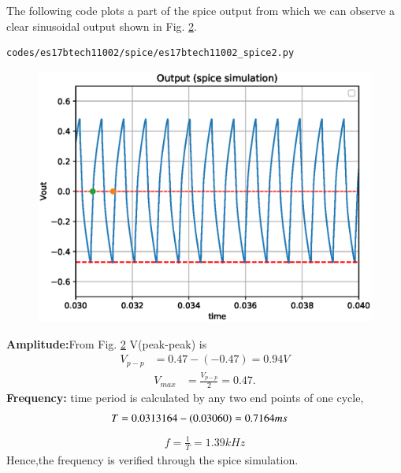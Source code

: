 \begin{enumerate}[label=\arabic*.,ref=\theenumi]
\begin{figure}[!ht]
\caption{}
\label{fig:es17btech11002_spice}
\end{figure}
%
The following code plots a part of the spice output from which we can observe a clear sinusoidal output shown in Fig. \ref{fig:es17btech11002_spice2}.
\begin{lstlisting}
codes/es17btech11002/spice/es17btech11002_spice2.py
\end{lstlisting}
\begin{figure}[!ht]
\centering
\includegraphics[width=\columnwidth]{./figs/es17btech11002/es17btech11002_spice2.eps}
\caption{}
\label{fig:es17btech11002_spice2}
\end{figure}
\renewcommand{\thefigure}{\theenumi}
\textbf{Amplitude:}From Fig. \ref{fig:es17btech11002_spice2} V(peak-peak) is 
\begin{align}
V_{p-p} &= 0.47-(-0.47) = 0.94V
\end{align}
\begin{align}
V_{max} &= \frac{V_{p-p}}{2} = 0.47.
\end{align}
\textbf{Frequency:} time period is calculated by any two end points of one cycle,
\begin{align}
T&=0.0313164 - \left(0.03060\right) = 0.7164 ms
\end{align}
\begin{align}
f = \frac{1}{T} = 1.39 kHz
\end{align}
Hence,the frequency is verified through the spice simulation.
\end{enumerate}
